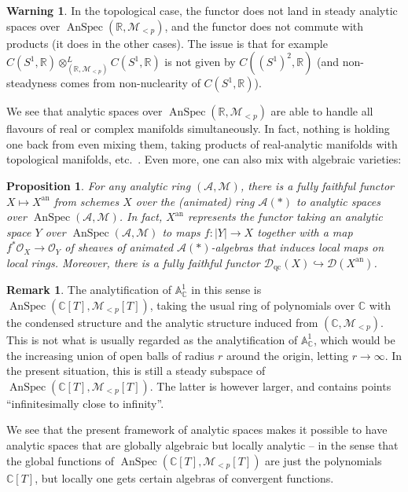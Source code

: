 \documentclass[11pt]{amsbook}
\DeclareMathOperator{\AnSpec}{AnSpec}
\numberwithin{equation}{section}
\numberwithin{theorem}{section}
\newtheorem{proposition}[theorem]{Proposition}
\theoremstyle{definition}
\newtheorem{remark}[theorem]{Remark}
\newtheorem{warning}[theorem]{Warning}
\begin{document}
\begin{warning} In the topological case, the functor does not land in steady analytic spaces over $\AnSpec(\mathbb R,\mathcal M_{<p})$, and the functor does not commute with products (it does in the other cases). The issue is that for example $C(S^1,\mathbb R)\otimes_{(\mathbb R,\mathcal M_{<p})}^L C(S^1,\mathbb R)$ is not given by $C((S^1)^2,\mathbb R)$ (and non-steadyness comes from non-nuclearity of $C(S^1,\mathbb R)$).
\end{warning}

We see that analytic spaces over $\AnSpec(\mathbb R,\mathcal M_{<p})$ are able to handle all flavours of real or complex manifolds simultaneously. In fact, nothing is holding one back from even mixing them, taking products of real-analytic manifolds with topological manifolds, etc.~. Even more, one can also mix with algebraic varieties:

\begin{proposition} For any analytic ring $(\mathcal A,\mathcal M)$, there is a fully faithful functor $X\mapsto X^{\mathrm{an}}$ from schemes $X$ over the (animated) ring $\mathcal A(\ast)$ to analytic spaces over $\AnSpec(\mathcal A,\mathcal M)$. In fact, $X^{\mathrm{an}}$ represents the functor taking an analytic space $Y$ over $\AnSpec(\mathcal A,\mathcal M)$ to maps $f: |Y|\to X$ together with a map $f^\ast \mathcal O_X\to \mathcal O_Y$ of sheaves of animated $\mathcal A(\ast)$-algebras that induces local maps on local rings. Moreover, there is a fully faithful functor $\mathcal D_{\mathrm{qc}}(X)\hookrightarrow \mathcal D(X^{\mathrm{an}})$.
\end{proposition}

\begin{remark} The analytification of $\mathbb A^1_{\mathbb C}$ in this sense is $\AnSpec(\mathbb C[T],\mathcal M_{<p}[T])$, taking the usual ring of polynomials over $\mathbb C$ with the condensed structure and the analytic structure induced from $(\mathbb C,\mathcal M_{<p})$. This is not what is usually regarded as the analytification of $\mathbb A^1_{\mathbb C}$, which would be the increasing union of open balls of radius $r$ around the origin, letting $r\to \infty$. In the present situation, this is still a steady subspace of $\AnSpec(\mathbb C[T],\mathcal M_{<p}[T])$. The latter is however larger, and contains points ``infinitesimally close to infinity''.

We see that the present framework of analytic spaces makes it possible to have analytic spaces that are globally algebraic but locally analytic -- in the sense that the global functions of $\AnSpec(\mathbb C[T],\mathcal M_{<p}[T])$ are just the polynomials $\mathbb C[T]$, but locally one gets certain algebras of convergent functions.
\end{remark}
\end{document}
